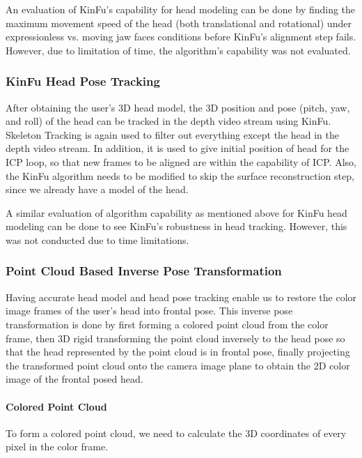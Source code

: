 \documentclass{ut-thesis}
\begin{document}
An evaluation of KinFu's capability for head modeling can be done by finding the maximum movement speed of the head (both translational and rotational) under expressionless vs. moving jaw faces conditions before KinFu's alignment step fails.  However, due to limitation of time, the algorithm's capability was not evaluated.


\subsubsection{KinFu Head Pose Tracking}
After obtaining the user's 3D head model, the 3D position and pose (pitch, yaw, and roll) of the head can be tracked in the depth video stream using KinFu.  Skeleton Tracking is again used to filter out everything except the head in the depth video stream.  In addition, it is used to give initial position of head for the ICP loop, so that new frames to be aligned are within the capability of ICP.  Also, the KinFu algorithm needs to be modified to skip the surface reconstruction step, since we already have a model of the head.

A similar evaluation of algorithm capability as mentioned above for KinFu head modeling can be done to see KinFu's robustness in head tracking.  However, this was not conducted due to time limitations.


\subsubsection{Point Cloud Based Inverse Pose Transformation}
Having accurate head model and head pose tracking enable us to restore the color image frames of the user's head into frontal pose.  This inverse pose transformation is done by first forming a colored point cloud from the color frame, then 3D rigid transforming the point cloud inversely to the head pose so that the head represented by the point cloud is in frontal pose, finally projecting the transformed point cloud onto the camera image plane to obtain the 2D color image of the frontal posed head.

\paragraph{Colored Point Cloud}
To form a colored point cloud, we need to calculate the 3D coordinates of every pixel in the color frame.
\end{document}
